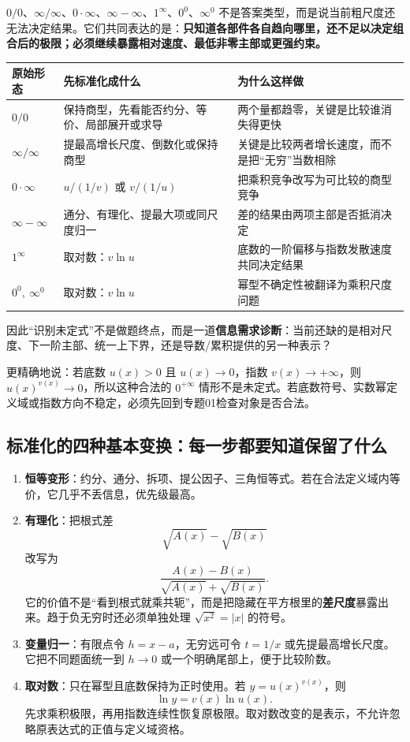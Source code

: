 \documentclass[11pt,a4paper]{ctexart}
\newcommand{\kw}[1]{\textbf{\color{deep}#1}}
\begin{document}
$0/0$、$\infty/\infty$、$0\cdot\infty$、$\infty-\infty$、$1^\infty$、$0^0$、$\infty^0$ 不是答案类型，而是说当前粗尺度还无法决定结果。它们共同表达的是：\textbf{只知道各部件各自趋向哪里，还不足以决定组合后的极限；必须继续暴露相对速度、最低非零主部或更强约束。}

\begin{center}
\begin{tabularx}{\linewidth}{L{2.2cm}L{3.1cm}Y}
\toprule
\textbf{原始形态} & \textbf{先标准化成什么} & \textbf{为什么这样做}\\
\midrule
$0/0$ & 保持商型，先看能否约分、等价、局部展开或求导 & 两个量都趋零，关键是比较谁消失得更快\\
$\infty/\infty$ & 提最高增长尺度、倒数化或保持商型 & 关键是比较两者增长速度，而不是把“无穷”当数相除\\
$0\cdot\infty$ & $u/(1/v)$ 或 $v/(1/u)$ & 把乘积竞争改写为可比较的商型竞争\\
$\infty-\infty$ & 通分、有理化、提最大项或同尺度归一 & 差的结果由两项主部是否抵消决定\\
$1^\infty$ & 取对数：$v\ln u$ & 底数的一阶偏移与指数发散速度共同决定结果\\
$0^0,\ \infty^0$ & 取对数：$v\ln u$ & 幂型不确定性被翻译为乘积尺度问题\\
\bottomrule
\end{tabularx}
\end{center}

因此“识别未定式”不是做题终点，而是一道\kw{信息需求诊断}：当前还缺的是相对尺度、下一阶主部、统一上下界，还是导数/累积提供的另一种表示？

更精确地说：若底数 $u(x)>0$ 且 $u(x)\to0$，指数 $v(x)\to+\infty$，则 $u(x)^{v(x)}\to0$，所以这种合法的 $0^{+\infty}$ 情形不是未定式。若底数符号、实数幂定义域或指数方向不稳定，必须先回到专题01检查对象是否合法。

\subsection{标准化的四种基本变换：每一步都要知道保留了什么}

\begin{enumerate}
  \item \kw{恒等变形}：约分、通分、拆项、提公因子、三角恒等式。若在合法定义域内等价，它几乎不丢信息，优先级最高。
  \item \kw{有理化}：把根式差
  \[
  \sqrt{A(x)}-\sqrt{B(x)}
  \]
  改写为
  \[
  \frac{A(x)-B(x)}{\sqrt{A(x)}+\sqrt{B(x)}}.
  \]
  它的价值不是“看到根式就乘共轭”，而是把隐藏在平方根里的\textbf{差尺度}暴露出来。趋于负无穷时还必须单独处理 $\sqrt{x^2}=\lvert x\rvert$ 的符号。
  \item \kw{变量归一}：有限点令 $h=x-a$，无穷远可令 $t=1/x$ 或先提最高增长尺度。它把不同题面统一到 $h\to0$ 或一个明确尾部上，便于比较阶数。
  \item \kw{取对数}：只在幂型且底数保持为正时使用。若 $y=u(x)^{v(x)}$，则
  \[
  \ln y=v(x)\ln u(x).
  \]
  先求乘积极限，再用指数连续性恢复原极限。取对数改变的是表示，不允许忽略原表达式的正值与定义域资格。
\end{enumerate}
\end{document}
